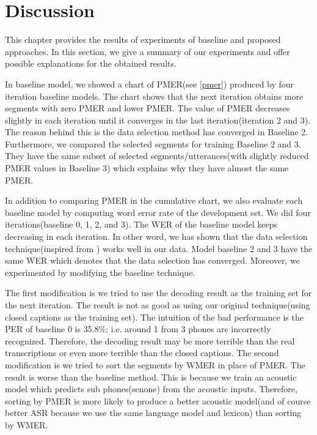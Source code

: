 \section{Discussion}
This chapter provides the results of experiments of baseline and proposed approaches. In this section, we give a summary of our experiments and offer possible explanations for the obtained results.

In baseline model, we showed a chart of PMER(see \ref{pmer}) produced by four iteration baseline models. The chart shows that the next iteration obtains more segments with zero PMER and lower PMER. The value of PMER decreases slightly in each iteration until it converges in the last iteration(iteration 2 and 3). The reason behind this is the data selection method has converged in Baseline 2. Furthermore, we compared the selected segments for training Baseline 2 and 3. They have the same subset of selected segments/utterances(with slightly reduced PMER values in Baseline 3) which explains why they have almost the same PMER.

In addition to comparing PMER in the cumulative chart, we also evaluate each baseline model by computing word error rate of the development set. We did four iterations(baseline 0, 1, 2, and 3). The WER of the baseline model keeps decreasing in each iteration. In other word, we has shown that the data selection technique(inspired from \cite{Lanchantin2016}) works well in our data. Model baseline 2 and 3 have the same WER which denotes that the data selection has converged. Moreover, we experimented by modifying the baseline technique. 

The first modification is we tried to use the decoding result as the training set for the next iteration. The result is not as good as using our original technique(using closed captions as the training set). The intuition of the bad performance is the PER of baseline 0 is 35.8\%; i.e. around 1 from 3 phones are incorrectly recognized. Therefore, the decoding result may be more terrible than the real transcriptions or even more terrible than the closed captions. The second modification is we tried to sort the segments by WMER in place of PMER. The result is worse than the baseline method. This is because we train an acoustic model which predicts sub phones(senone) from the acoustic inputs. Therefore, sorting by PMER is more likely to produce a better acoustic model(and of course better ASR because we use the same language model and lexicon) than sorting by WMER.

